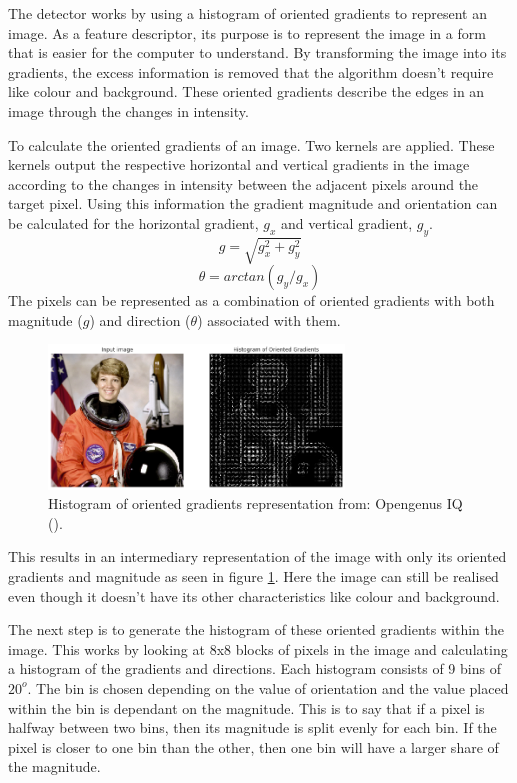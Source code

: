 \documentclass{l4proj}
\begin{document}
The detector works by using a histogram of oriented gradients to represent an image. As a feature descriptor, its purpose is to represent the image in a form that is easier for the computer to understand. By transforming the image into its gradients, the excess information is removed that the algorithm doesn't require like colour and background. These oriented gradients describe the edges in an image through the changes in intensity. 

To calculate the oriented gradients of an image. Two kernels are applied. These kernels output the respective horizontal and vertical gradients in the image according to the changes in intensity between the adjacent pixels around the target pixel. Using this information the gradient magnitude and orientation can be calculated for the horizontal gradient, \(g_x\) and vertical gradient, \(g_y\).
\[ g = \sqrt{g_x^2 + g_y^2} \]
\[ \theta = arctan (g_y/g_x) \]
The pixels can be represented as a combination of oriented gradients with both magnitude (\(g\)) and direction (\(\theta\)) associated with them.

\begin{figure}[h!]
  \centering
  \begin{minipage}{\textwidth}
  \centering
    \includegraphics[width=0.7\textwidth]{images/hog_face.png}
    \caption{Histogram of oriented gradients representation from: Opengenus IQ (\cite{hogastro}).}
    \label{hog_face}
  \end{minipage}
  \hfill
\end{figure}

This results in an intermediary representation of the image with only its oriented gradients and magnitude as seen in figure \ref{hog_face}. Here the image can still be realised even though it doesn't have its other characteristics like colour and background.

The next step is to generate the histogram of these oriented gradients within the image. This works by looking at 8x8 blocks of pixels in the image and calculating a histogram of the gradients and directions. Each histogram consists of 9 bins of \(20^o\). The bin is chosen depending on the value of orientation and the value placed within the bin is dependant on the magnitude. This is to say that if a pixel is halfway between two bins, then its magnitude is split evenly for each bin. If the pixel is closer to one bin than the other, then one bin will have a larger share of the magnitude.
\end{document}

